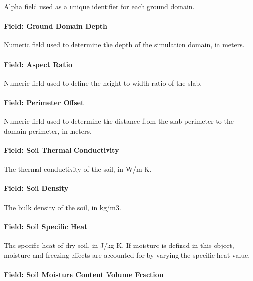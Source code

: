Alpha field used as a unique identifier for each ground domain.

\paragraph{Field: Ground Domain Depth}\label{field-ground-domain-depth}

Numeric field used to determine the depth of the simulation domain, in meters.

\paragraph{Field: Aspect Ratio}\label{field-aspect-ratio}

Numeric field used to define the height to width ratio of the slab.

\paragraph{Field: Perimeter Offset}\label{field-perimeter-offset}

Numeric field used to determine the distance from the slab perimeter to the domain perimeter, in meters.

\paragraph{Field: Soil Thermal Conductivity}\label{field-soil-thermal-conductivity-3}

The thermal conductivity of the soil, in W/m-K.

\paragraph{Field: Soil Density}\label{field-soil-density-3}

The bulk density of the soil, in kg/m3.

\paragraph{Field: Soil Specific Heat}\label{field-soil-specific-heat-3}

The specific heat of dry soil, in J/kg-K. If moisture is defined in this object, moisture and freezing effects are accounted for by varying the specific heat value.

\paragraph{Field: Soil Moisture Content Volume Fraction}\label{field-soil-moisture-content-volume-fraction-1}

